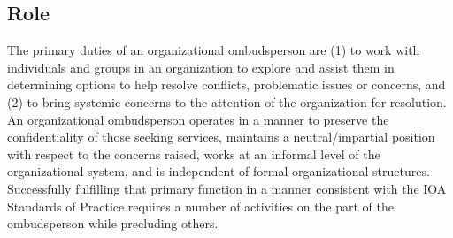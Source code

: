 \documentclass[12pt]{article}
\begin{document}
\subsection{Role}

The primary duties of an organizational ombudsperson are (1) to work with individuals and groups in an organization to explore and assist them in determining options to help resolve conflicts, problematic issues or concerns, and (2) to bring systemic concerns to the attention of the organization for resolution. An organizational ombudsperson operates in a manner to preserve the confidentiality of those seeking services, maintains a neutral/impartial position with respect to the concerns raised, works at an informal level of the organizational system, and is independent of formal organizational structures. Successfully fulfilling that primary function in a manner consistent with the IOA Standards of Practice requires a number of activities on the part of the ombudsperson while precluding others.
\end{document}
